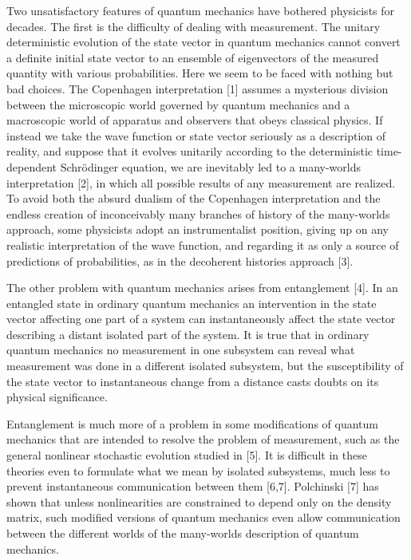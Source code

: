\documentclass[12pt]{article}
\begin{document}
Two unsatisfactory features of quantum mechanics  have bothered physicists for decades.  The first is the difficulty of dealing with measurement.   The unitary deterministic evolution of the state vector in quantum mechanics cannot convert a definite initial state vector to an ensemble of eigenvectors of the measured quantity with various probabilities.  Here we seem to be faced with nothing but bad choices.  The Copenhagen interpretation [1] assumes  a mysterious division between the microscopic world governed by quantum mechanics and a macroscopic world of apparatus and observers that obeys classical physics.  If instead we take the wave function or state vector seriously as a description of reality, and suppose that it evolves unitarily according to the deterministic time-dependent Schr\"{o}dinger equation, we are inevitably led to a many-worlds interpretation [2], in which all possible results of any measurement are realized.     To avoid both the absurd dualism of the Copenhagen interpretation and   the endless creation of inconceivably many branches of history of the many-worlds approach, some physicists adopt an instrumentalist position, giving  up on any realistic interpretation of the wave function, and regarding it as only a source of predictions of probabilities, as in the decoherent histories approach [3].

The other problem with quantum mechanics arises from entanglement [4].  In an entangled state in ordinary quantum mechanics  an intervention in the state vector affecting one part of a system can instantaneously affect the state vector  describing a distant isolated part of the system.  It is true that in ordinary quantum mechanics no measurement in one subsystem can reveal what measurement was done in a different isolated subsystem, but  the susceptibility of the state vector  to instantaneous change from a distance  casts doubts on its physical significance.  

Entanglement is much more of a problem in some modifications of quantum mechanics that are intended to resolve the problem of measurement, such as  the general nonlinear stochastic evolution studied in [5].  It is difficult in these theories even to formulate what we mean by isolated subsystems, much less to prevent instantaneous communication between them [6,7].  Polchinski [7] has shown that unless nonlinearities are constrained to depend only on the density matrix,   such modified versions of quantum mechanics even allow communication between the different worlds of the many-worlds description of quantum mechanics.
\end{document}
